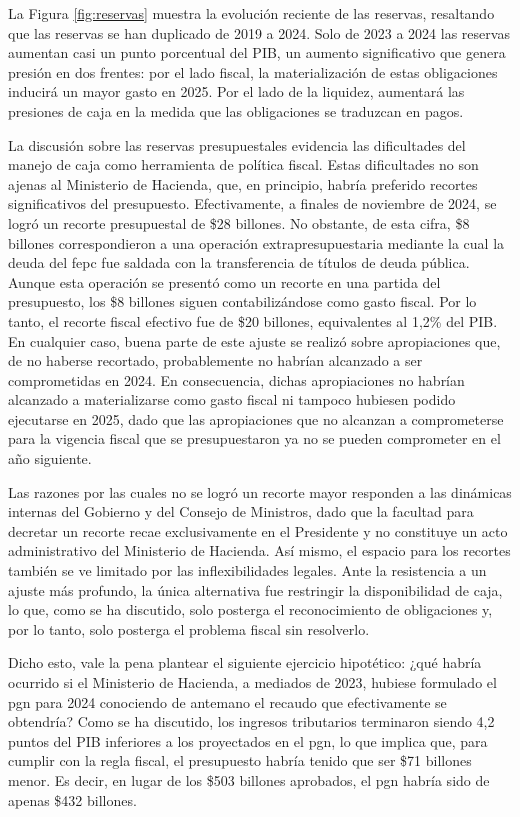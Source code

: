 La Figura \ref{fig:reservas} muestra la evolución reciente de las reservas, resaltando que las reservas se han duplicado de 2019 a 2024. Solo de 2023 a 2024 las reservas aumentan casi un punto porcentual del PIB, un aumento significativo que genera presión en dos frentes: por el lado fiscal, la materialización de estas obligaciones inducirá un mayor gasto en 2025. Por el lado de la liquidez, aumentará las presiones de caja en la medida que las obligaciones se traduzcan en pagos.

La discusión sobre las reservas presupuestales evidencia las dificultades del manejo de caja como herramienta de política fiscal. Estas dificultades no son ajenas al Ministerio de Hacienda, que, en principio, habría preferido recortes significativos del presupuesto. Efectivamente, a finales de noviembre de 2024, se logró un recorte presupuestal de \$28 billones. No obstante, de esta cifra, \$8 billones correspondieron a una operación extrapresupuestaria mediante la cual la deuda del \gls{fepc} fue saldada con la transferencia de títulos de deuda pública. Aunque esta operación se presentó como un recorte en una partida del presupuesto, los \$8 billones siguen contabilizándose como gasto fiscal. Por lo tanto, el recorte fiscal efectivo fue de \$20 billones, equivalentes al 1,2\% del PIB. En cualquier caso, buena parte de este ajuste se realizó sobre apropiaciones que, de no haberse recortado, probablemente no habrían alcanzado a ser comprometidas en 2024. En consecuencia, dichas apropiaciones no habrían alcanzado a materializarse como gasto fiscal ni tampoco hubiesen podido ejecutarse en 2025, dado que las apropiaciones que no alcanzan a comprometerse para la vigencia fiscal que se presupuestaron ya no se pueden comprometer en el año siguiente.

Las razones por las cuales no se logró un recorte mayor responden a las dinámicas internas del Gobierno y del Consejo de Ministros, dado que la facultad para decretar un recorte recae exclusivamente en el Presidente y no constituye un acto administrativo del Ministerio de Hacienda. Así mismo, el espacio para los recortes también se ve limitado por las inflexibilidades legales. Ante la resistencia a un ajuste más profundo, la única alternativa fue restringir la disponibilidad de caja, lo que, como se ha discutido, solo posterga el reconocimiento de obligaciones y, por lo tanto, solo posterga el problema fiscal sin resolverlo.

Dicho esto, vale la pena plantear el siguiente ejercicio hipotético: ¿qué habría ocurrido si el Ministerio de Hacienda, a mediados de 2023, hubiese formulado el \gls{pgn} para 2024 conociendo de antemano el recaudo que efectivamente se obtendría? Como se ha discutido, los ingresos tributarios terminaron siendo 4,2 puntos del PIB inferiores a los proyectados en el \gls{pgn}, lo que implica que, para cumplir con la regla fiscal, el presupuesto habría tenido que ser \$71 billones menor. Es decir, en lugar de los \$503 billones aprobados, el \gls{pgn} habría sido de apenas \$432 billones.

